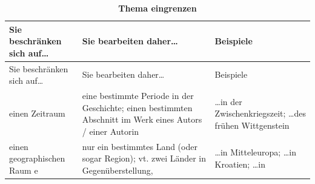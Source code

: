 \documentclass[]{book}
\theoremstyle{definition}
\theoremstyle{definition}
\theoremstyle{definition}
\theoremstyle{remark}
\begin{document}
\begin{longtable}[]{@{}lll@{}}
\caption{\textbf{\label{tab:eingrenzen} Thema eingrenzen}}\tabularnewline
\toprule
\begin{minipage}[b]{0.31\columnwidth}\raggedright\strut
Sie beschränken sich auf\ldots{}\strut
\end{minipage} & \begin{minipage}[b]{0.30\columnwidth}\raggedright\strut
Sie bearbeiten daher\ldots{}\strut
\end{minipage} & \begin{minipage}[b]{0.30\columnwidth}\raggedright\strut
Beispiele\strut
\end{minipage}\tabularnewline
\midrule
\endfirsthead
\toprule
\begin{minipage}[b]{0.31\columnwidth}\raggedright\strut
Sie beschränken sich auf\ldots{}\strut
\end{minipage} & \begin{minipage}[b]{0.30\columnwidth}\raggedright\strut
Sie bearbeiten daher\ldots{}\strut
\end{minipage} & \begin{minipage}[b]{0.30\columnwidth}\raggedright\strut
Beispiele\strut
\end{minipage}\tabularnewline
\midrule
\endhead
\begin{minipage}[t]{0.31\columnwidth}\raggedright\strut
einen Zeitraum\strut
\end{minipage} & \begin{minipage}[t]{0.30\columnwidth}\raggedright\strut
eine bestimmte Periode in der Geschichte; einen bestimmten Abschnitt im
Werk eines Autors / einer Autorin\strut
\end{minipage} & \begin{minipage}[t]{0.30\columnwidth}\raggedright\strut
\ldots{}in der Zwischenkriegszeit; \ldots{}des frühen
Wittgenstein\vspace{5mm}\strut
\end{minipage}\tabularnewline
\begin{minipage}[t]{0.31\columnwidth}\raggedright\strut
einen geographischen Raum e\strut
\end{minipage} & \begin{minipage}[t]{0.30\columnwidth}\raggedright\strut
nur ein bestimmtes Land (oder sogar Region); vt. zwei Länder in
Gegenüberstellung,\strut
\end{minipage} & \begin{minipage}[t]{0.30\columnwidth}\raggedright\strut
\ldots{}in Mitteleuropa; \ldots{}in Kroatien; \ldots{}in

\end{minipage}
\end{longtable}
\end{document}
